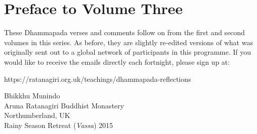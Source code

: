 \chapter{Preface to Volume Three}

These Dhammapada verses and comments follow on from the first and second volumes
in this series. As before, they are slightly re-edited versions of what was
originally sent out to a global network of participants in this programme. If
you would like to receive the emails directly each fortnight, please sign up at:

\bigskip

\noindent
https://ratanagiri.org.uk/teachings/dhammapada-reflections

\bigskip

{\par\raggedleft
Bhikkhu Munindo\\
Aruna Ratanagiri Buddhist Monastery\\
Northumberland, UK\\
Rainy Season Retreat (\emph{Vassa}) 2015
\par}